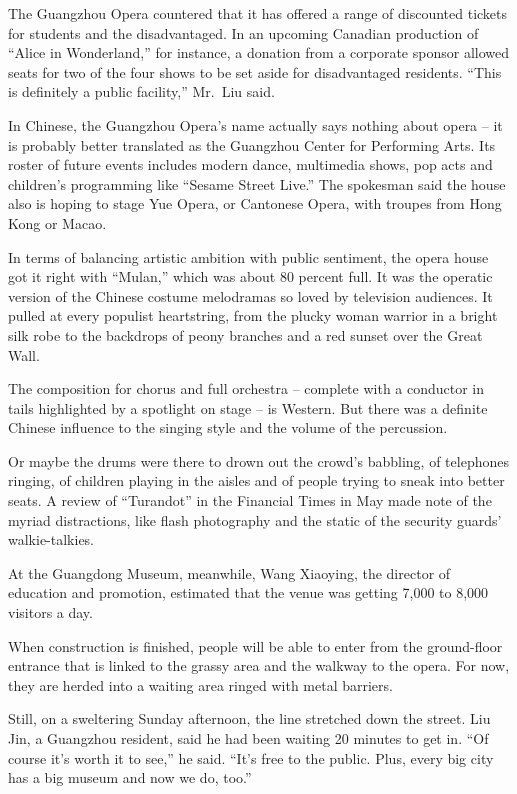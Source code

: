 ﻿\documentclass[12pt]{article}
\begin{document}
The Guangzhou Opera countered that it has offered a range of discounted tickets for students and the
disadvantaged. In an upcoming Canadian production of ``Alice in Wonderland,'' for instance, a
donation from a corporate sponsor allowed seats for two of the four shows to be set aside for
disadvantaged residents. ``This is definitely a public facility,'' Mr.~Liu said.

In Chinese, the Guangzhou Opera's name actually says nothing about opera -- it is probably better
translated as the Guangzhou Center for Performing Arts. Its roster of future events includes modern
dance, multimedia shows, pop acts and children's programming like ``Sesame Street Live.'' The
spokesman said the house also is hoping to stage Yue Opera, or Cantonese Opera, with troupes from
Hong Kong or Macao.

In terms of balancing artistic ambition with public sentiment, the opera house got it right with
``Mulan,'' which was about 80 percent full. It was the operatic version of the Chinese costume
melodramas so loved by television audiences. It pulled at every populist heartstring, from the
plucky woman warrior in a bright silk robe to the backdrops of peony branches and a red sunset over
the Great Wall.

The composition for chorus and full orchestra -- complete with a conductor in tails highlighted by a
spotlight on stage -- is Western. But there was a definite Chinese influence to the singing style
and the volume of the percussion.

Or maybe the drums were there to drown out the crowd's babbling, of telephones ringing, of children
playing in the aisles and of people trying to sneak into better seats. A review of ``Turandot'' in
the Financial Times in May made note of the myriad distractions, like flash photography and the
static of the security guards' walkie-talkies.

At the Guangdong Museum, meanwhile, Wang Xiaoying, the director of education and promotion,
estimated that the venue was getting 7,000 to 8,000 visitors a day.

When construction is finished, people will be able to enter from the ground-floor entrance that is
linked to the grassy area and the walkway to the opera. For now, they are herded into a waiting area
ringed with metal barriers.

Still, on a sweltering Sunday afternoon, the line stretched down the street. Liu Jin, a Guangzhou
resident, said he had been waiting 20 minutes to get in. ``Of course it's worth it to see,'' he
said. ``It's free to the public. Plus, every big city has a big museum and now we do, too.''
\end{document}
